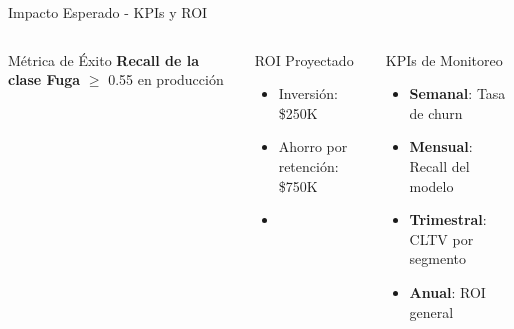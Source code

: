 \begin{frame}{Impacto Esperado - KPIs y ROI}
    \begin{columns}[t]
        \begin{metricblock}{Métrica de Éxito}
            \textbf{Recall de la clase Fuga} $\ge$ 0.55 en producción
        \end{metricblock}
        
        \begin{block}{ROI Proyectado}
            \begin{itemize}
                \item Inversión: \$250K
                \item Ahorro por retención: \$750K
                \item {}
            \end{itemize}
        \end{block}
        
        \begin{block}{KPIs de Monitoreo}
            \begin{itemize}
                \item \textbf{Semanal}: Tasa de churn
                \item \textbf{Mensual}: Recall del modelo
                \item \textbf{Trimestral}: CLTV por segmento
                \item \textbf{Anual}: ROI general
            \end{itemize}
        \end{block}
    \end{columns}
\end{frame}

